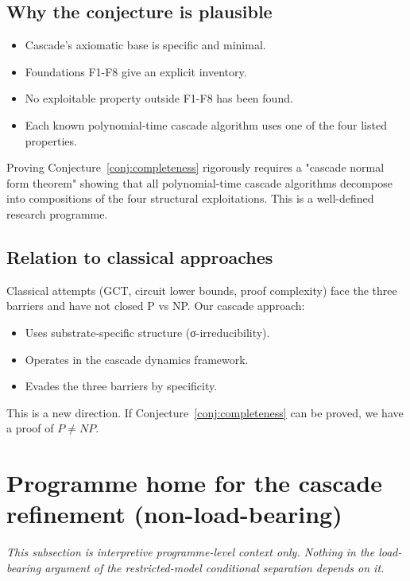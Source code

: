 \documentclass[11pt, a4paper]{amsart}
\theoremstyle{definition}
\begin{document}
\subsection{Why the conjecture is plausible}

\begin{itemize}
\item Cascade's axiomatic base is specific and minimal.
\item Foundations F1-F8 give an explicit inventory.
\item No exploitable property outside F1-F8 has been found.
\item Each known polynomial-time cascade algorithm uses one of the four
    listed properties.
\end{itemize}

Proving Conjecture~\ref{conj:completeness} rigorously requires
a "cascade normal form theorem" showing that all polynomial-time
cascade algorithms decompose into compositions of the four
structural exploitations. This is a well-defined research programme.

\subsection{Relation to classical approaches}

Classical attempts (GCT, circuit lower bounds, proof complexity)
face the three barriers and have not closed P vs NP. Our cascade
approach:
\begin{itemize}
\item Uses substrate-specific structure (σ-irreducibility).
\item Operates in the cascade dynamics framework.
\item Evades the three barriers by specificity.
\end{itemize}

This is a new direction. If Conjecture~\ref{conj:completeness} can be
proved, we have a proof of $P \neq NP$.

\section{Programme home for the cascade refinement (non-load-bearing)}\label{sec:aria_home}

\emph{This subsection is interpretive programme-level context only.
Nothing in the load-bearing argument of the restricted-model
conditional separation depends on it.}\medskip
\end{document}
